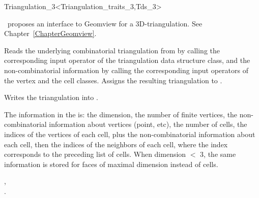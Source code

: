 \begin{ccRefClass}{Triangulation_3<Triangulation_traits_3,Tds_3>}
\begin{ccAdvanced}
\end{ccAdvanced}


\cgal\ proposes an interface to Geomview for a 3D-triangulation. 
See Chapter~\ref{ChapterGeomview}. 

{Reads the underlying combinatorial triangulation from  by
calling the corresponding input operator of the triangulation data
structure class, and the non-combinatorial information by calling the
corresponding input operators of the vertex and the cell
classes. Assigns the resulting triangulation to .}

{Writes the triangulation  into .}

The information in the  is: the dimension, the number of
finite vertices, the non-combinatorial information about vertices (point,
etc), the number of cells, the indices of the vertices of each cell,
plus the non-combinatorial information about each cell, 
then the indices of the neighbors of each cell, where the index
corresponds to the preceding list of cells. When dimension $<$ 3, the
same information is stored for faces of maximal dimension instead of
cells. 

\ccSeeAlso

,\\
.



\end{ccRefClass}


